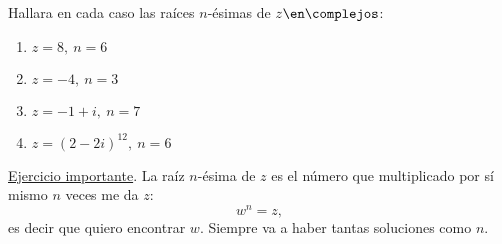 \begin{enunciado}{\ejercicio}
  Hallara en cada caso las raíces $n$-ésimas de $z \en \complejos$:
  \begin{multicols}{2}
    \begin{enumerate}[label=\roman*)]
      \item $z =  8,\ n = 6$
      \item $z = -4,\ n = 3$
      \item $z = -1 + i,\ n = 7$
      \item $z = (2-2i)^{12},\ n = 6$
    \end{enumerate}
  \end{multicols}
\end{enunciado}

\underline{Ejercicio importante}. La raíz $n$-ésima de $z$ es el número que multiplicado por sí mismo $n$ veces me da $z$:
$$
  w^n = z,
$$
es decir que quiero encontrar $w$. Siempre va a haber tantas soluciones como $n$.

